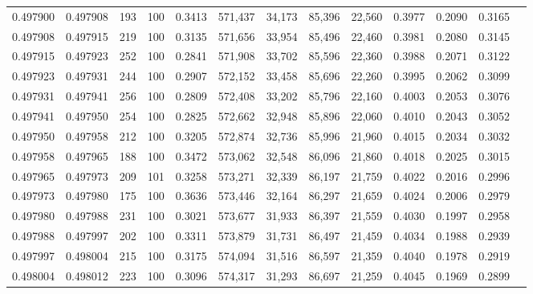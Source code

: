 \begin{tabular}{rrrrrrrrrrrrr}
0.497900 & 0.497908 &   193 & 100 &                                     0.3413 & 571,437 &  34,173 &  85,396 &  22,560 & 0.3977 & 0.2090 & 0.3165 \\
0.497908 & 0.497915 &   219 & 100 &                                     0.3135 & 571,656 &  33,954 &  85,496 &  22,460 & 0.3981 & 0.2080 & 0.3145 \\
0.497915 & 0.497923 &   252 & 100 &                                     0.2841 & 571,908 &  33,702 &  85,596 &  22,360 & 0.3988 & 0.2071 & 0.3122 \\
0.497923 & 0.497931 &   244 & 100 &                                     0.2907 & 572,152 &  33,458 &  85,696 &  22,260 & 0.3995 & 0.2062 & 0.3099 \\
0.497931 & 0.497941 &   256 & 100 &                                     0.2809 & 572,408 &  33,202 &  85,796 &  22,160 & 0.4003 & 0.2053 & 0.3076 \\
0.497941 & 0.497950 &   254 & 100 &                                     0.2825 & 572,662 &  32,948 &  85,896 &  22,060 & 0.4010 & 0.2043 & 0.3052 \\
0.497950 & 0.497958 &   212 & 100 &                                     0.3205 & 572,874 &  32,736 &  85,996 &  21,960 & 0.4015 & 0.2034 & 0.3032 \\
0.497958 & 0.497965 &   188 & 100 &                                     0.3472 & 573,062 &  32,548 &  86,096 &  21,860 & 0.4018 & 0.2025 & 0.3015 \\
0.497965 & 0.497973 &   209 & 101 &                                     0.3258 & 573,271 &  32,339 &  86,197 &  21,759 & 0.4022 & 0.2016 & 0.2996 \\
0.497973 & 0.497980 &   175 & 100 &                                     0.3636 & 573,446 &  32,164 &  86,297 &  21,659 & 0.4024 & 0.2006 & 0.2979 \\
0.497980 & 0.497988 &   231 & 100 &                                     0.3021 & 573,677 &  31,933 &  86,397 &  21,559 & 0.4030 & 0.1997 & 0.2958 \\
0.497988 & 0.497997 &   202 & 100 &                                     0.3311 & 573,879 &  31,731 &  86,497 &  21,459 & 0.4034 & 0.1988 & 0.2939 \\
0.497997 & 0.498004 &   215 & 100 &                                     0.3175 & 574,094 &  31,516 &  86,597 &  21,359 & 0.4040 & 0.1978 & 0.2919 \\
0.498004 & 0.498012 &   223 & 100 &                                     0.3096 & 574,317 &  31,293 &  86,697 &  21,259 & 0.4045 & 0.1969 & 0.2899 \\

\end{tabular}
